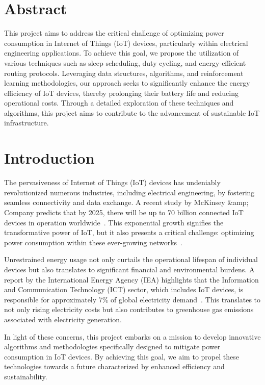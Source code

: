 \documentclass[11pt,a4paper]{article}
\begin{document}
\section{Abstract}
This project aims to address the critical challenge of optimizing power consumption in Internet of Things (IoT) devices, particularly within electrical engineering applications. To achieve this goal, we propose the utilization of various techniques such as sleep scheduling, duty cycling, and energy-efficient routing protocols. Leveraging data structures, algorithms, and reinforcement learning methodologies, our approach seeks to significantly enhance the energy efficiency of IoT devices, thereby prolonging their battery life and reducing operational costs. Through a detailed exploration of these techniques and algorithms, this project aims to contribute to the advancement of sustainable IoT infrastructure.

\section{Introduction}
The pervasiveness of Internet of Things (IoT) devices has undeniably revolutionized numerous industries, including electrical engineering, by fostering seamless connectivity and data exchange. A recent study by McKinsey \&amp; Company predicts that by 2025, there will be up to 70 billion connected IoT devices in operation worldwide~\cite{McKinsey_IoT_2020}. This exponential growth signifies the transformative power of IoT, but it also presents a critical challenge: optimizing power consumption within these ever-growing networks~\cite{Al-Fuqaha_IoT_Survey_2015}.

Unrestrained energy usage not only curtails the operational lifespan of individual devices but also translates to significant financial and environmental burdens. A report by the International Energy Agency (IEA) highlights that the Information and Communication Technology (ICT) sector, which includes IoT devices, is responsible for approximately 7\% of global electricity demand~\cite{IEA_Buildings_Report_2023}. This translates to not only rising electricity costs but also contributes to greenhouse gas emissions associated with electricity generation.

In light of these concerns, this project embarks on a mission to develop innovative algorithms and methodologies specifically designed to mitigate power consumption in IoT devices. By achieving this goal, we aim to propel these technologies towards a future characterized by enhanced efficiency and sustainability.
\end{document}
